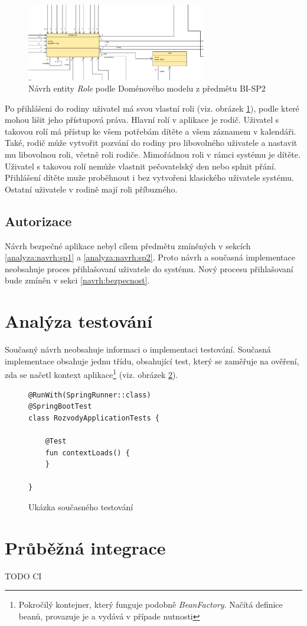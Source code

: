         \begin{figure}
	        \includegraphics[width=0.7\textwidth]{pdfs/Role1}
	        \caption[Návrh \textit{Role}]{Návrh entity \textit{Role} podle Doménového modelu z předmětu BI-SP2}\label{image:Role1}
        \end{figure}
        Po přihlášeni do rodiny uživatel má svou vlastní roli (viz. obrázek \ref{image:Role1}), podle které mohou lišit jeho přístupová práva. Hlavní rolí v aplikace je rodič. Uživatel s takovou rolí má přístup ke všem potřebám dítěte a všem záznamem v kalendáři. Také, rodič může vytvořit pozvání do rodiny pro libovolného uživatele a nastavit mu libovolnou roli, včetně roli rodiče. Mimořádnou roli v rámci systému je dítěte. Uživatel s takovou rolí nemůže vlastnit pečovatelský den nebo splnit přání. Přihlášení dítěte muže proběhnout i bez vytvořeni klasického uživatele systému. Ostatní uživatele v rodině mají roli příbuzného.
    
    \subsection{Autorizace}
        Návrh bezpečné aplikace nebyl cílem předmětu zmíněných v sekcích \ref{analyza:navrh:sp1} a \ref{analyza:navrh:sp2}. Proto návrh a současná implementace neobsahuje proces přihlašovaní uživatele do systému. Nový procesu přihlašovaní bude zmíněn v sekci \ref{navrh:bezpecnost}.
        
\section{Analýza testování}\label{analyza:testovani}
    Současný návrh neobsahuje informaci o implementaci testování. Současná implementace obsahuje jednu třídu, obsahující test, který se zaměřuje na ověření, zda se načetl {kontext aplikace}\footnote{Pokročilý kontejner, který funguje podobně \textit{BeanFactory}. Načítá definice beanů, provazuje je a vydává v případe nutnosti} (viz. obrázek \ref{code:test-context-loads1}).
    \begin{figure}
    \begin{verbatim}
@RunWith(SpringRunner::class)
@SpringBootTest
class RozvodyApplicationTests {

    @Test
    fun contextLoads() {
    }

}
        \end{verbatim}
        \caption{Ukázka současného testování} 
        \label{code:test-context-loads1}
        \end{figure}
\section{Průběžná integrace}
    TODO CI
   